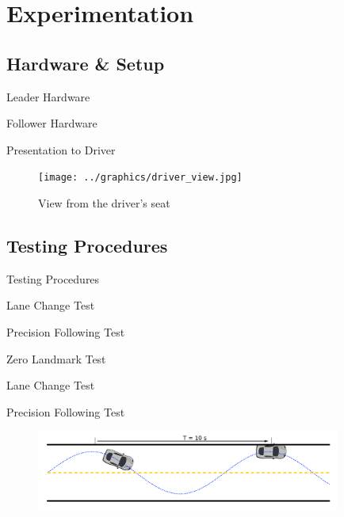 \documentclass{beamer}
\begin{document}
\section{Experimentation}

  \subsection{Hardware \& Setup}

    \begin{frame}{Leader Hardware}
    \end{frame}

    \begin{frame}{Follower Hardware}
    \end{frame}

    \begin{frame}{Presentation to Driver}
      \begin{figure}[ht] \centering
        \texttt{[image: ../graphics/driver\_view.jpg]}
        \caption{View from the driver's seat} \label{fig:driver_view}
      \end{figure}
    \end{frame}

  \subsection{Testing Procedures}

    \begin{frame}{Testing Procedures}
    
      Lane Change Test

      Precision Following Test
      
      Zero Landmark Test

    \end{frame}

    \begin{frame}{Lane Change Test}
      \begin{figure}
        
      \end{figure}
    \end{frame}

    \begin{frame}{Precision Following Test}
      \begin{figure}
        \includegraphics[width=10cm]{../graphics/precision_following_diagram.png}
      \end{figure}   
    \end{frame}
\end{document}

